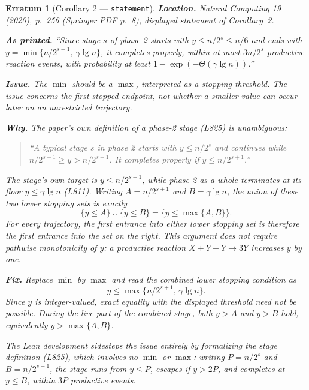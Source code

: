 \documentclass[11pt]{article}
\theoremstyle{erratumstyle}
\newtheorem{erratum}{Erratum}
\newcommand{\lgn}{\lg n}
\begin{document}
\begin{erratum}[Corollary 2 --- \texttt{statement}]
\textbf{Location.} \emph{Natural Computing} 19 (2020), p.~256
(Springer PDF p.~8), displayed statement of Corollary~2.

\medskip
\textbf{As printed.}
``Since stage $s$ of phase 2 starts with $y \le n/2^s \le n/6$ and ends with
$y = \min\{n/2^{s+1},\ \gamma \lgn\}$, it completes properly, within at most
$3n/2^s$ productive reaction events, with probability at least
$1 - \exp(-\Theta(\gamma \lgn))$.''

\medskip
\textbf{Issue.} The $\min$ should be a $\max$, interpreted as a stopping
threshold. The issue concerns the first stopped endpoint, not whether a
smaller value can occur later on an unrestricted trajectory.

\medskip
\textbf{Why.} The paper's own definition of a phase-2 stage (L825) is
unambiguous:

\begin{quote}
``A typical stage $s$ in phase 2 starts with $y \le n/2^s$ and continues while
$n/2^{s-1} \ge y > n/2^{s+1}$. It completes properly if $y \le n/2^{s+1}$.''
\end{quote}

The stage's own target is $y\le n/2^{s+1}$, while phase 2 as a whole
terminates at its floor $y\le\gamma\lgn$ (L811). Writing
$A=n/2^{s+1}$ and $B=\gamma\lgn$, the union of these two lower stopping
sets is exactly
\[
  \{y\le A\}\cup\{y\le B\}
    =\{y\le\max\{A,B\}\}.
\]
For every trajectory, the first entrance into either lower stopping set
is therefore the first entrance into the set on the right. This argument
does not require pathwise monotonicity of $y$: a productive reaction
$X+Y+Y\to3Y$ increases $y$ by one.

\medskip
\textbf{Fix.} Replace $\min$ by $\max$ and read the combined lower
stopping condition as
\[
  y\le\max\{n/2^{s+1},\,\gamma\lgn\}.
\]
Since $y$ is integer-valued, exact equality with the displayed threshold
need not be possible. During the live part of the combined stage, both
$y>A$ and $y>B$ hold, equivalently $y>\max\{A,B\}$.

The Lean development sidesteps the issue entirely by formalizing the
\emph{stage definition} (L825), which involves no $\min$ or $\max$: writing
$P = n/2^s$ and $B = n/2^{s+1}$, the stage runs from $y \le P$, escapes if
$y > 2P$, and completes at $y \le B$, within $3P$ productive events.
\end{erratum}
\end{document}

